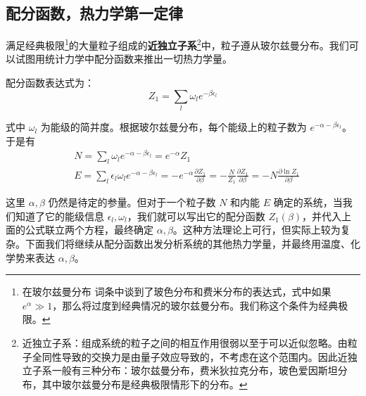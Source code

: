 

\subsection{配分函数，热力学第一定律}

满足经典极限\footnote{在玻尔兹曼分布 词条中谈到了玻色分布和费米分布的表达式，式中如果 $e^\alpha\gg 1$，那么将过度到经典情况的玻尔兹曼分布。我们称这个条件为经典极限。}的大量粒子组成的\textbf{近独立子系}\footnote{近独立子系：组成系统的粒子之间的相互作用很弱以至于可以近似忽略。由粒子全同性导致的交换力是由量子效应导致的，不考虑在这个范围内。因此近独立子系一般有三种分布：玻尔兹曼分布，费米狄拉克分布，玻色爱因斯坦分布，其中玻尔兹曼分布是经典极限情形下的分布。}中，粒子遵从玻尔兹曼分布。我们可以试图用统计力学中配分函数来推出一切热力学量。

配分函数表达式为：
\begin{equation}
Z_1=\sum_l \omega_l e^{-\beta \epsilon_l}
\end{equation}

式中 $\omega_l$ 为能级的简并度。根据玻尔兹曼分布，每个能级上的粒子数为 $e^{-\alpha-\beta\epsilon_l}$。于是有
\begin{equation}\label{TheSta_eq4}
\begin{aligned}
&N=\sum_l \omega_l e^{-\alpha-\beta\epsilon_l}=e^{-\alpha} Z_1\\
&E=\sum_l \epsilon_l \omega_l e^{-\alpha-\beta\epsilon_l}=-e^{-\alpha}\frac{\partial Z_1}{\partial \beta}=-\frac{N}{Z_1}\frac{\partial Z_1}{\partial \beta}=-N\frac{\partial \ln Z_1}{\partial \beta}
\end{aligned}
\end{equation}

这里 $\alpha,\beta$ 仍然是待定的参量。但对于一个粒子数 $N$ 和内能 $E$ 确定的系统，当我们知道了它的能级信息 $\epsilon_l,\omega_l$，我们就可以写出它的配分函数 $Z_1(\beta)$，并代入上面的公式联立两个方程，最终确定 $\alpha,\beta$。这种方法理论上可行，但实际上较为复杂。下面我们将继续从配分函数出发分析系统的其他热力学量，并最终用温度、化学势来表达 $\alpha,\beta$。
